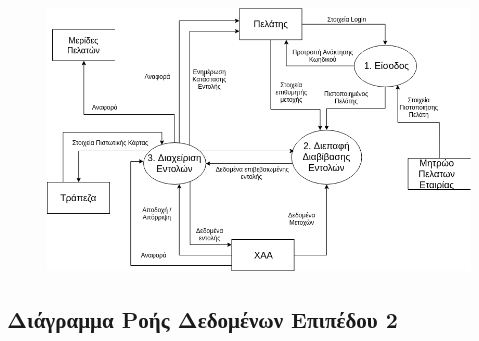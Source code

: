 \documentclass{article}
\begin{document}
	\begin{figure}[!h]
		\includegraphics[width=\linewidth]{../Structured_Analysis/Level_1_Diagram.png}
	\end{figure}

	\newpage
	\subsection{Διάγραμμα Ροής Δεδομένων Επιπέδου 2}
\end{document}
